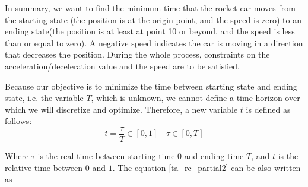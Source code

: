 \documentclass  [
  paper    = a4,
  BCOR     = 10mm,
  twoside,
  fontsize = 12pt,
  fleqn,
  toc      = bibnumbered,
  toc      = listofnumbered,
  numbers  = noendperiod,
  headings = normal,
  listof   = leveldown,
  version  = 3.03
]                                       {scrreprt}
\newcommand{\<}{\langle}
\renewcommand{\>}{\rangle}
\begin{document}
   In summary, we want to find the minimum time that the rocket car moves from the starting state (the position is at the origin point, and the speed is zero) to an ending state(the position is at least at point 10 or beyond, and the speed is less than or equal to zero). A negative speed indicates the car is moving in a direction that decreases the position. During the whole process, constraints on the acceleration/deceleration value and the speed are to be satisfied. 
   
   Because our objective is to minimize the time between starting state and ending state, i.e. the variable $T$, which is unknown, we cannot define a time horizon over which we will discretize and optimize. Therefore, a new variable $t$ is defined as follows: 
   \begin{equation}
   t= \frac{\tau}{T} \in [0,1] \quad \tau \in [0, T]
   \label{eqn:timet}
   \end{equation}
   
   Where $\tau$ is the real time between starting time $0$ and ending time $T$, and $t$ is the relative time between $0$ and $1$.  The equation \ref{ta_rc_partial2} can be also written as 
   
\end{document}
